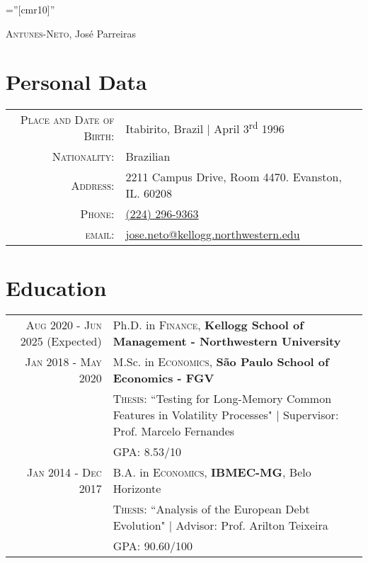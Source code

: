 \documentclass[a4paper,10pt]{article}
\begin{document}
\pagestyle{empty} %

\font\fb=''[cmr10]'' %

\par{\centering
		{\Huge \textsc{Antunes-Neto}, José Parreiras
	}\bigskip\par}

\section{Personal Data}

\begin{tabular}{rp{9.75cm}}
    \textsc{Place and Date of Birth:} & Itabirito, Brazil  | April 3\textsuperscript{rd}  1996 \\
    \textsc{Nationality:} & Brazilian\\
    \textsc{Address:}   & 2211 Campus Drive, Room 4470. Evanston, IL. 60208\\
    \textsc{Phone:}     & \href{tel:2242969363}{(224) 296-9363}\\
    \textsc{email:}     & \href{mailto:jose.neto@kellogg.northwestern.edu}{jose.neto@kellogg.northwestern.edu} \\
    \end{tabular}


\section{Education}
\begin{tabular}{r|p{8.75cm}}	
\textsc{Aug} 2020 - \textsc{Jun} 2025 (Expected) & Ph.D. in \textsc{Finance}, \normalsize\textbf{Kellogg School of Management - Northwestern University} \\
\textsc{Jan} 2018 - \textsc{May} 2020 & M.Sc. in \textsc{Economics}, \normalsize\textbf{São Paulo School of Economics - FGV} \\
& \normalsize \textsc{Thesis}: ``Testing for Long-Memory Common Features in Volatility Processes" | \small Supervisor: Prof. Marcelo Fernandes \\ 
&\normalsize \textsc{GPA}: 8.53/10
\\
\textsc{Jan} 2014 - \textsc{Dec} 2017& B.A. in \textsc{Economics}, \normalsize\textbf{IBMEC-MG}, Belo Horizonte \\
& \normalsize \textsc{Thesis}: ``Analysis of the European Debt Evolution" | \small Advisor: Prof. Arilton Teixeira \\
&\normalsize \textsc{GPA}: 90.60/100
\\
\end{tabular}
\end{document}
